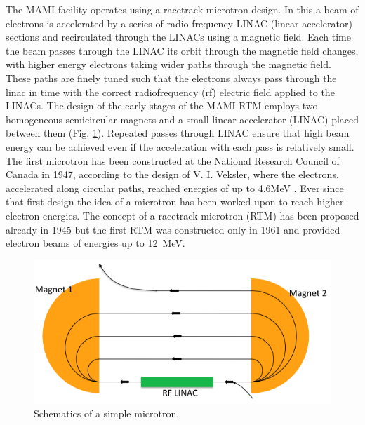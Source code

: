 \indent The MAMI facility operates using a racetrack microtron design.  In this a beam of electrons is accelerated by a series of radio frequency LINAC (linear accelerator) sections and recirculated through the LINACs using a magnetic field. Each time the beam passes through the LINAC its orbit through the magnetic field changes, with higher energy electrons taking wider paths through the magnetic field. These paths are finely tuned such that the electrons always pass through the linac in time with the correct radiofrequency (rf) electric field applied to the LINACs.  The design of the early stages of the MAMI RTM employs two homogeneous semicircular magnets and a small linear accelerator (LINAC) placed between them (Fig. \ref{microtronplot}).
Repeated passes through LINAC ensure that high beam energy can be achieved even if the acceleration with each pass is relatively small. The first microtron has been constructed at the National Research Council of Canada in 1947, according to the design of V. I. Veksler, where the electrons, accelerated along circular paths, reached energies of up to 4.6MeV \cite{dehn}. Ever since that first design the idea of a microtron has been worked upon to reach higher electron energies. The concept of a  racetrack microtron (RTM) has been proposed already in 1945 but the first RTM was constructed only in 1961 and provided electron beams of energies up to 12~MeV. 
\begin{figure}[H]
\begin{center}
\includegraphics[scale=0.55]{pictures/png/rfm.png}
\caption{Schematics of a simple microtron.}
\label{microtronplot}
\end{center}
\end{figure}

